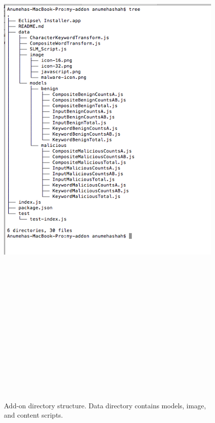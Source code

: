 \begin{figure}[htb]
\centering
\includegraphics[width=16cm,height=30cm,keepaspectratio]{image/tree.png}
\caption[Add-on directory structure]{Add-on directory structure. Data directory contains models, image, and content scripts.} 
\label{fig:tree}
\end{figure}

